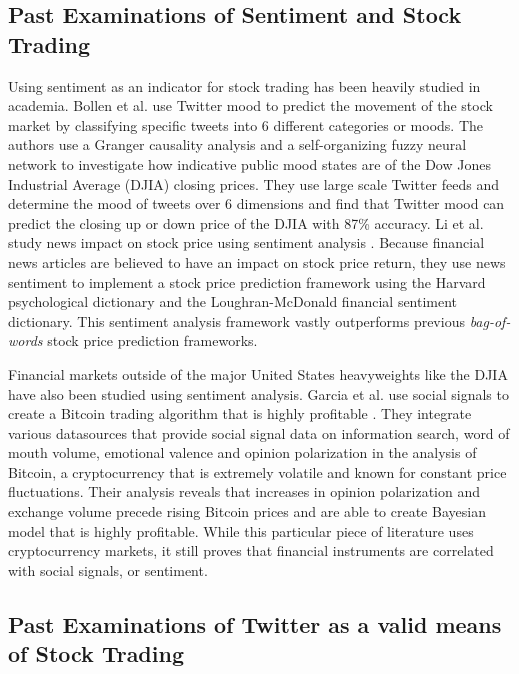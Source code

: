 \documentclass[../thesis.tex]{subfiles}
\begin{document}
\subsection{Past Examinations of Sentiment and Stock Trading}

Using sentiment as an indicator for stock trading has been heavily studied in academia. Bollen et al. \cite{Bollen} use Twitter mood to predict the movement of the stock market by classifying specific tweets into 6 different categories or moods. The authors use a Granger causality analysis and a self-organizing fuzzy neural network to investigate how indicative public mood states are of the Dow Jones Industrial Average (DJIA) closing prices. They use large scale Twitter feeds and determine the mood of tweets over 6 dimensions and find that Twitter mood can predict the closing up or down price of the DJIA with 87\% accuracy. Li et al. study news impact on stock price using sentiment analysis \cite{Li2014}. Because financial news articles are believed to have an impact on stock price return, they use news sentiment to implement a stock price prediction framework using the Harvard psychological dictionary and the Loughran-McDonald financial sentiment dictionary. This sentiment analysis framework vastly outperforms previous \textit{bag-of-words} stock price prediction frameworks. 

Financial markets outside of the major United States heavyweights like the DJIA have also been studied using sentiment analysis. Garcia et al. use social signals to create a Bitcoin trading algorithm that is highly profitable \cite{Garcia2015}. They integrate various datasources that provide social signal data on information search, word of mouth volume, emotional valence and opinion polarization in the analysis of Bitcoin, a cryptocurrency that is extremely volatile and known for constant price fluctuations. Their analysis reveals that increases in opinion polarization and exchange volume precede rising Bitcoin prices and are able to create Bayesian model that is highly profitable. While this particular piece of literature uses cryptocurrency markets, it still proves that financial instruments are correlated with social signals, or sentiment.  

\subsection{Past Examinations of Twitter as a valid means of Stock Trading}
\end{document}
